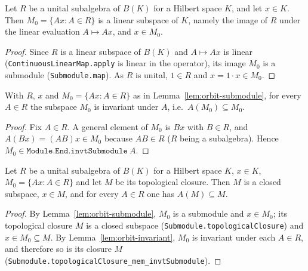 \begin{lemma}
    \label{lem:orbit-submodule}
    \leanok
    Let $R$ be a unital subalgebra of $B(K)$ for a Hilbert space $K$, and let
    $x \in K$. Then $M_0 = \{A x : A \in R\}$ is a linear subspace of $K$, namely
    the image of $R$ under the linear evaluation $A \mapsto A x$, and $x \in M_0$.
\end{lemma}
\begin{proof}
    Since $R$ is a linear subspace of $B(K)$ and $A \mapsto A x$ is linear
    (\texttt{ContinuousLinearMap.apply} is linear in the operator), its image
    $M_0$ is a submodule (\texttt{Submodule.map}). As $R$ is unital, $1 \in R$
    and $x = 1 \cdot x \in M_0$.
\end{proof}

\begin{lemma}
    \label{lem:orbit-invariant}
    \leanok
    With $R$, $x$ and $M_0 = \{A x : A \in R\}$ as in
    Lemma~\ref{lem:orbit-submodule}, for every $A \in R$ the subspace $M_0$ is
    invariant under $A$, i.e.\ $A(M_0) \subseteq M_0$.
\end{lemma}
\begin{proof}
    Fix $A \in R$. A general element of $M_0$ is $B x$ with $B \in R$, and
    $A(B x) = (A B) x \in M_0$ because $A B \in R$ ($R$ being a subalgebra).
    Hence $M_0 \in \texttt{Module.End.invtSubmodule}\ A$.
\end{proof}

\begin{lemma}
    \label{lem:invariant-closure}
    \leanok
    Let $R$ be a unital subalgebra of $B(K)$ for a Hilbert space $K$, $x \in K$,
    $M_0 = \{A x : A \in R\}$ and let $M$ be its topological closure. Then $M$ is
    a closed subspace, $x \in M$, and for every $A \in R$ one has
    $A(M) \subseteq M$.
\end{lemma}
\begin{proof}
    By Lemma~\ref{lem:orbit-submodule}, $M_0$ is a submodule and $x \in M_0$; its
    topological closure $M$ is a closed subspace
    (\texttt{Submodule.topologicalClosure}) and $x \in M_0 \subseteq M$. By
    Lemma~\ref{lem:orbit-invariant}, $M_0$ is invariant under each $A \in R$, and
    therefore so is its closure $M$
    (\texttt{Submodule.topologicalClosure\_mem\_invtSubmodule}).
\end{proof}

